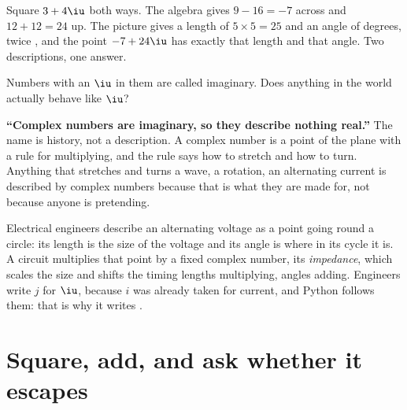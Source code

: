


\noindent
Square $3 + 4\iu$ both ways. The algebra gives $9 - 16 = -7$ across and
$12 + 12 = 24$ up. The picture gives a length of $5 \times 5 = 25$ and an
angle of  degrees, twice , and the
point $-7 + 24\iu$ has exactly that length and that angle. Two descriptions,
one answer.

\begin{think}
Numbers with an $\iu$ in them are called imaginary. Does anything in the
world actually behave like $\iu$?
\end{think}

\begin{trapbox}
\textbf{\enquote{Complex numbers are imaginary, so they describe nothing
real.}} The name is history, not a description. A complex number is a point
of the plane with a rule for multiplying, and the rule says how to stretch
and how to turn. Anything that stretches and turns \dash{} a wave, a
rotation, an alternating current \dash{} is described by complex numbers
because that is what they are made for, not because anyone is pretending.
\end{trapbox}

\begin{worldbox}
Electrical engineers describe an alternating voltage as a point going round
a circle: its length is the size of the voltage and its angle is where in
its cycle it is. A circuit multiplies that point by a fixed complex number,
its \emph{impedance}, which scales the size and shifts the timing \dash{}
lengths multiplying, angles adding. Engineers write $j$ for $\iu$, because
$i$ was already taken for current, and Python follows them: that is why it
writes .
\end{worldbox}

\section{Square, add, and ask whether it escapes}
\label{sec:ch12-escape}

